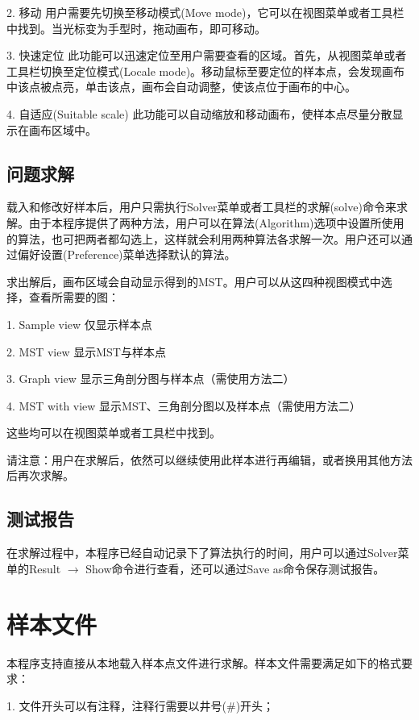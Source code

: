 \documentclass[11pt, a4paper]{article}
\newcommand{\hei}{\CJKfamily{hei}}
\begin{document}
		2. 移动 \quad 用户需要先切换至移动模式(Move mode)，它可以在视图菜单或者工具栏中找到。当光标变为手型时，拖动画布，即可移动。

		3. 快速定位 \quad 此功能可以迅速定位至用户需要查看的区域。首先，从视图菜单或者工具栏切换至定位模式(Locale mode)。移动鼠标至要定位的样本点，会发现画布中该点被点亮，单击该点，画布会自动调整，使该点位于画布的中心。

		4. 自适应(Suitable scale) \quad 此功能可以自动缩放和移动画布，使样本点尽量分散显示在画布区域中。

		\subsection{问题求解}

		载入和修改好样本后，用户只需执行Solver菜单或者工具栏的求解(solve)命令来求解。由于本程序提供了两种方法，用户可以在算法(Algorithm)选项中设置所使用的算法，也可把两者都勾选上，这样就会利用两种算法各求解一次。用户还可以通过偏好设置(Preference)菜单选择默认的算法。

		求出解后，画布区域会自动显示得到的MST。用户可以从这四种视图模式中选择，查看所需要的图：

		1. Sample view \quad 仅显示样本点

		2. MST view \quad 显示MST与样本点

		3. Graph view \quad 显示三角剖分图与样本点（需使用{\hei 方法二}）

		4. MST with view \quad 显示MST、三角剖分图以及样本点（需使用{\hei 方法二}）

		这些均可以在视图菜单或者工具栏中找到。

		请{\hei 注意}：用户在求解后，依然可以继续使用此样本进行再编辑，或者换用其他方法后再次求解。

		\subsection{测试报告}

		在求解过程中，本程序已经自动记录下了算法执行的时间，用户可以通过Solver菜单的Result $\rightarrow$ Show命令进行查看，还可以通过Save as命令保存测试报告。

	\section{样本文件}

	本程序支持直接从本地载入样本点文件进行求解。样本文件需要满足如下的格式要求：

	1. 文件开头可以有注释，注释行需要以井号(\#)开头；
\end{document}
